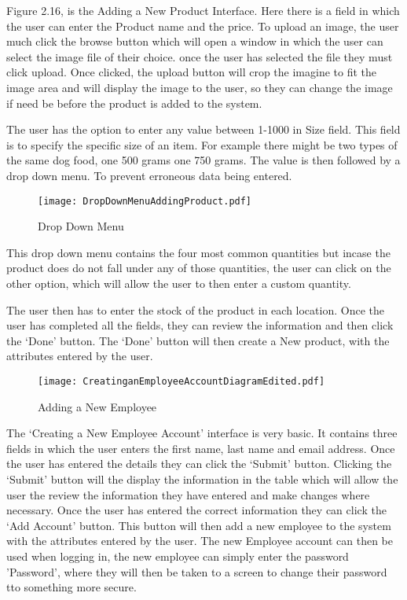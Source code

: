 Figure 2.16, is the Adding a New Product Interface. Here there is a field in which the user can enter the Product name and the price. To upload an image, the user much click the browse button which will open a window in which the user can select the image file of their choice. once the user has selected the file they must click upload. Once clicked, the upload button will crop the imagine to fit the image area and will display the image to the user, so they can change the image if need be before the product is added to the system. \par

The user has the option to enter any value between 1-1000 in Size field.  This field is to specify the specific size of an item. For example there might be two types of the same dog food, one 500 grams one 750 grams. The value is then followed by a drop down menu. To prevent erroneous data being entered. \par


\begin{figure}[H]
\caption{Drop Down Menu} \label{fig:Drop Down Menu}
\hfill\texttt{[image: DropDownMenuAddingProduct.pdf]}\hspace*{\fill}
\end{figure}

This drop down menu contains the four most common quantities but incase the product does do not fall under any of those quantities, the user can click on the other option, which will allow the user to then enter a custom quantity. \par

The user then has to enter the stock of the product in each location. Once the user has completed all the fields, they can review the information and then click the `Done' button. The `Done' button will then create a New product, with the attributes entered by the user. \par

\begin{figure}[H]
\caption{Adding a New Employee} \label{fig:Adding a New Employee Interface}
\hfill\texttt{[image: CreatinganEmployeeAccountDiagramEdited.pdf]}\hspace*{\fill}
\end{figure}

The `Creating a New Employee Account' interface is very basic. It contains three fields in which the user enters the first name, last name and email address. Once the user has entered the details they can click the `Submit' button. Clicking the `Submit' button will the display the information in the table which will allow the user the review the information they have entered and make changes where necessary. Once the user has entered the correct information they can click the `Add Account' button. This button will then add a new employee to the system with the attributes entered by the user. The new Employee account can then be used when logging in, the new employee can simply enter the password 'Password', where they will then be taken to a screen to change their password tto something more secure. \par

